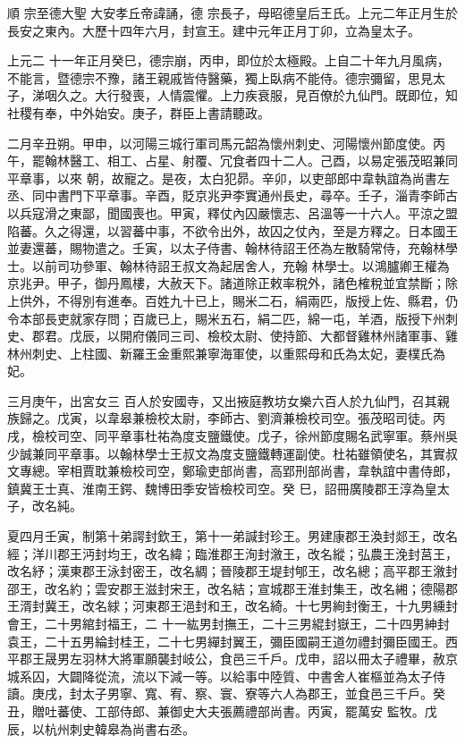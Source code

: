 
\begin{pinyinscope}

 順
 宗至德大聖
 大安孝丘帝諱誦，德
 宗長子，母昭德皇后王氏。上元二年正月生於長安之東內。大歷十四年六月，封宣王。建中元年正月丁卯，立為皇太子。



 上元二
 十一年正月癸巳，德宗崩，丙申，即位於太極殿。上自二十年九月風病，不能言，暨德宗不豫，諸王親戚皆侍醫藥，獨上臥病不能侍。德宗彌留，思見太子，涕咽久之。大行發喪，人情震懼。上力疾衰服，見百僚於九仙門。既即位，知社稷有奉，中外始安。庚子，群臣上書請聽政。



 二月辛丑朔。甲申，以河陽三城行軍司馬元韶為懷州刺史、河陽懷州節度使。丙午，罷翰林醫工、相工、占星、射覆、冗食者四十二人。己酉，以易定張茂昭兼同平章事，以來
 朝，故寵之。是夜，太白犯昴。辛卯，以吏部郎中韋執誼為尚書左丞、同中書門下平章事。辛酉，貶京兆尹李實通州長史，尋卒。壬子，淄青李師古以兵寇滑之東鄙，聞國喪也。甲寅，釋仗內囚嚴懷志、呂溫等一十六人。平涼之盟陷蕃。久之得還，以習蕃中事，不欲令出外，故囚之仗內，至是方釋之。日本國王並妻還蕃，賜物遣之。壬寅，以太子侍書、翰林待詔王伾為左散騎常侍，充翰林學士。以前司功參軍、翰林待詔王叔文為起居舍人，充翰
 林學士。以鴻臚卿王權為京兆尹。甲子，御丹鳳樓，大赦天下。諸道除正敕率稅外，諸色榷稅並宜禁斷；除上供外，不得別有進奉。百姓九十已上，賜米二石，絹兩匹，版授上佐、縣君，仍令本部長吏就家存問；百歲已上，賜米五石，絹二匹，綿一屯，羊酒，版授下州刺史、郡君。戊辰，以開府儀同三司、檢校太尉、使持節、大都督雞林州諸軍事、雞林州刺史、上柱國、新羅王金重熙兼寧海軍使，以重熙母和氏為太妃，妻樸氏為妃。



 三月庚午，出宮女三
 百人於安國寺，又出掖庭教坊女樂六百人於九仙門，召其親族歸之。戊寅，以韋皋兼檢校太尉，李師古、劉濟兼檢校司空。張茂昭司徒。丙戌，檢校司空、同平章事杜祐為度支鹽鐵使。戊子，徐州節度賜名武寧軍。蔡州吳少誠兼同平章事。以翰林學士王叔文為度支鹽鐵轉運副使。杜祐雖領使名，其實叔文專總。宰相賈耽兼檢校司空，鄭瑜吏部尚書，高郢刑部尚書，韋執誼中書侍郎，鎮冀王士真、淮南王鍔、魏博田季安皆檢校司空。癸
 巳，詔冊廣陵郡王淳為皇太子，改名純。



 夏四月壬寅，制第十弟諤封欽王，第十一弟諴封珍王。男建康郡王渙封郯王，改名經；洋川郡王沔封均王，改名緯；臨淮郡王洵封漵王，改名縱；弘農王浼封莒王，改名紓；漢東郡王泳封密王，改名綢；晉陵郡王堤封郇王，改名總；高平郡王漵封邵王，改名約；雲安郡王滋封宋王，改名結；宣城郡王淮封集王，改名緗；德陽郡王湑封冀王，改名絿；河東郡王浥封和王，改名綺。十七男絢封衡王，十九男纁封會王，二十男綰封福王，二
 十一紘男封撫王，二十三男緄封嶽王，二十四男紳封袁王，二十五男綸封桂王，二十七男繟封翼王，彌臣國嗣王道勿禮封彌臣國王。西平郡王晟男左羽林大將軍願襲封岐公，食邑三千戶。戊申，詔以冊太子禮畢，赦京城系囚，大闢降從流，流以下減一等。以給事中陸質、中書舍人崔樞並為太子侍讀。庚戌，封太子男寧、寬、宥、察、寰、寮等六人為郡王，並食邑三千戶。癸丑，贈吐蕃使、工部侍郎、兼御史大夫張薦禮部尚書。丙寅，罷萬安
 監牧。戊辰，以杭州刺史韓皋為尚書右丞。




\end{pinyinscope}
